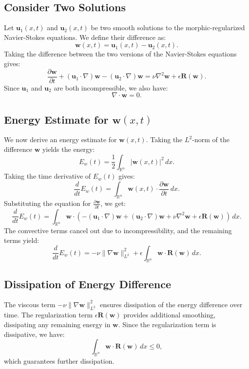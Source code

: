 \documentclass{article}
\begin{document}
\subsection*{Consider Two Solutions}

Let \( \mathbf{u}_1(x,t) \) and \( \mathbf{u}_2(x,t) \) be two smooth solutions to the morphic-regularized Navier-Stokes equations. We define their difference as:
\[
\mathbf{w}(x,t) = \mathbf{u}_1(x,t) - \mathbf{u}_2(x,t).
\]
Taking the difference between the two versions of the Navier-Stokes equations gives:
\[
\frac{\partial \mathbf{w}}{\partial t} + (\mathbf{u}_1 \cdot \nabla) \mathbf{w} - (\mathbf{u}_2 \cdot \nabla) \mathbf{w} = \nu \nabla^2 \mathbf{w} + \epsilon \mathbf{R}(\mathbf{w}).
\]
Since \( \mathbf{u}_1 \) and \( \mathbf{u}_2 \) are both incompressible, we also have:
\[
\nabla \cdot \mathbf{w} = 0.
\]

\subsection*{Energy Estimate for \( \mathbf{w}(x,t) \)}

We now derive an energy estimate for \( \mathbf{w}(x,t) \). Taking the \( L^2 \)-norm of the difference \( \mathbf{w} \) yields the energy:
\[
E_w(t) = \frac{1}{2} \int_{\mathbb{R}^n} |\mathbf{w}(x,t)|^2 \, dx.
\]
Taking the time derivative of \( E_w(t) \) gives:
\[
\frac{d}{dt} E_w(t) = \int_{\mathbb{R}^n} \mathbf{w}(x,t) \cdot \frac{\partial \mathbf{w}}{\partial t} \, dx.
\]
Substituting the equation for \( \frac{\partial \mathbf{w}}{\partial t} \), we get:
\[
\frac{d}{dt} E_w(t) = \int_{\mathbb{R}^n} \mathbf{w} \cdot \left( - (\mathbf{u}_1 \cdot \nabla) \mathbf{w} + (\mathbf{u}_2 \cdot \nabla) \mathbf{w} + \nu \nabla^2 \mathbf{w} + \epsilon \mathbf{R}(\mathbf{w}) \right) \, dx.
\]
The convective terms cancel out due to incompressibility, and the remaining terms yield:
\[
\frac{d}{dt} E_w(t) = - \nu \|\nabla \mathbf{w}\|_{L^2}^2 + \epsilon \int_{\mathbb{R}^n} \mathbf{w} \cdot \mathbf{R}(\mathbf{w}) \, dx.
\]

\subsection*{Dissipation of Energy Difference}

The viscous term \( - \nu \|\nabla \mathbf{w}\|_{L^2}^2 \) ensures dissipation of the energy difference over time. The regularization term \( \epsilon \mathbf{R}(\mathbf{w}) \) provides additional smoothing, dissipating any remaining energy in \( \mathbf{w} \). Since the regularization term is dissipative, we have:
\[
\int_{\mathbb{R}^n} \mathbf{w} \cdot \mathbf{R}(\mathbf{w}) \, dx \leq 0,
\]
which guarantees further dissipation.
\end{document}
